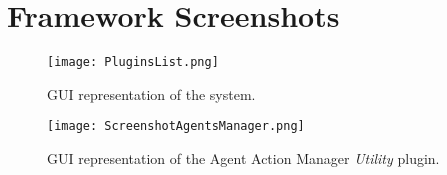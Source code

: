 \appendix

\section{Framework Screenshots}

\begin{figure}[H]
	\centering
	\texttt{[image: PluginsList.png]}
	\caption{\ac{GUI} representation of the system.}
	\label{fig:pluginList}
\end{figure}

\begin{figure}[H]
	\centering
	\texttt{[image: ScreenshotAgentsManager.png]}
	\caption{\ac{GUI} representation of the Agent Action Manager \textit{Utility} plugin.}
	\label{fig:agentActionsManagerScreenshot}
\end{figure}

